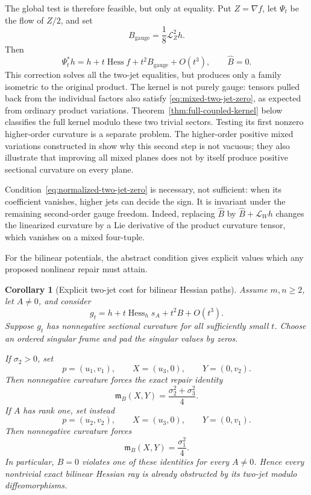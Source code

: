 \documentclass[11pt]{amsart}
\newtheorem{corollary}[theorem]{Corollary}
\theoremstyle{definition}
\theoremstyle{remark}
\DeclareMathOperator{\Hess}{Hess}
\begin{document}
The global test is therefore feasible, but only at equality.  Put
$Z=\nabla f$, let $\Psi_t$ be the flow of $Z/2$, and set
\begin{equation}\label{eq:gauge-repair}
 B_{\mathrm{gauge}}=\frac18\mathcal L_Z^2h.
\end{equation}
Then
\[
 \Psi_t^*h
 =h+t\Hess f+t^2B_{\mathrm{gauge}}+O(t^3),
 \qquad \widehat B=0.
\]
This correction solves all the two-jet equalities, but produces only
a family isometric to the original product.  The kernel is not purely
gauge: tensors pulled back from the individual factors also satisfy
\eqref{eq:mixed-two-jet-zero}, as expected from ordinary product
variations.  Theorem~\ref{thm:full-coupled-kernel} below classifies the
full kernel modulo these two trivial sectors.  Testing its first
nonzero higher-order curvature is a separate problem.
The higher-order positive mixed variations constructed in
\cite{BourguignonDeschampsSentenac1973} show why this second step is
not vacuous; they also illustrate that improving all mixed planes does
not by itself produce positive sectional curvature on every plane.

Condition~\eqref{eq:normalized-two-jet-zero} is necessary, not
sufficient: when its coefficient vanishes, higher jets can decide the
sign.  It is invariant under the remaining second-order gauge freedom.
Indeed, replacing $\widehat B$ by
$\widehat B+\mathcal L_Wh$ changes the linearized curvature by a Lie
derivative of the product curvature tensor, which vanishes on a mixed
four-tuple.

For the bilinear potentials, the abstract condition gives explicit
values which any proposed nonlinear repair must attain.

\begin{corollary}[Explicit two-jet cost for bilinear Hessian paths]
\label{cor:two-jet-cost}
Assume $m,n\geq2$, let $A\neq0$, and consider
\begin{equation}\label{eq:corrected-bilinear-path}
 g_t=h+t\Hess_hs_A+t^2B+O(t^3).
\end{equation}
Suppose $g_t$ has nonnegative sectional curvature for all sufficiently
small $t$.  Choose an ordered singular frame and pad the singular
values by zeros.

If $\sigma_2>0$, set
\[
 p=(u_1,v_1),\qquad X=(u_3,0),\qquad Y=(0,v_2).
\]
Then nonnegative curvature forces the exact repair identity
\begin{equation}\label{eq:two-jet-cost-rank-two}
 \mathfrak m_B(X,Y)=
 \frac{\sigma_2^2+\sigma_3^2}{4}.
\end{equation}
If $A$ has rank one, set instead
\[
 p=(u_2,v_2),\qquad X=(u_3,0),\qquad Y=(0,v_1).
\]
Then nonnegative curvature forces
\begin{equation}\label{eq:two-jet-cost-rank-one}
 \mathfrak m_B(X,Y)=\frac{\sigma_1^2}{4}.
\end{equation}
In particular, $B=0$ violates one of these identities for every
$A\neq0$.  Hence every nontrivial exact bilinear Hessian ray is
already obstructed by its two-jet modulo diffeomorphisms.
\end{corollary}
\end{document}
